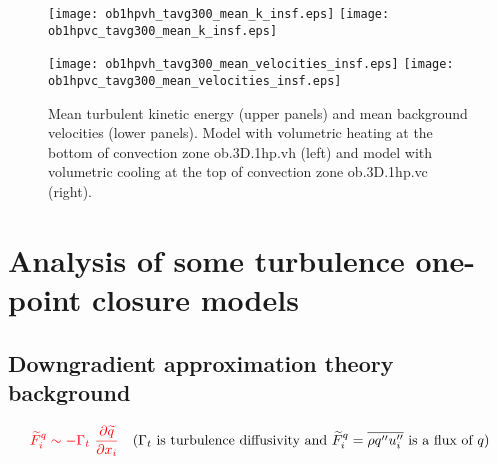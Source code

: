 \documentclass[10pt,paper=a4]{report}
\newcommand{\eht}{\overline}
\newcommand{\fht}{\widetilde}
\begin{document}
\begin{figure}[!h]
\centerline{
\texttt{[image: ob1hpvh\_tavg300\_mean\_k\_insf.eps]}
\texttt{[image: ob1hpvc\_tavg300\_mean\_k\_insf.eps]}}

\centerline{
\texttt{[image: ob1hpvh\_tavg300\_mean\_velocities\_insf.eps]}
\texttt{[image: ob1hpvc\_tavg300\_mean\_velocities\_insf.eps]}}
\caption{Mean turbulent kinetic energy (upper panels) and mean background velocities (lower panels). Model with volumetric heating at the bottom of convection zone {\sf ob.3D.1hp.vh} (left) and model with volumetric cooling at the top of convection zone {\sf ob.3D.1hp.vc} (right).}
\end{figure}


\newpage

\section{Analysis of some turbulence one-point closure models}

\subsection{Downgradient approximation theory background}

\begin{align}
{\color{red}\fht{F}_i^q \sim -\Gamma_t \ \frac{\partial \fht{q}}{\partial x_i}} \ \ \ \mbox{($\Gamma_t$ is turbulence diffusivity and $\fht{F}^q_i = \eht{\rho q''u''_i}$ is a flux of $q$)} \nonumber
\end{align}
\end{document}
